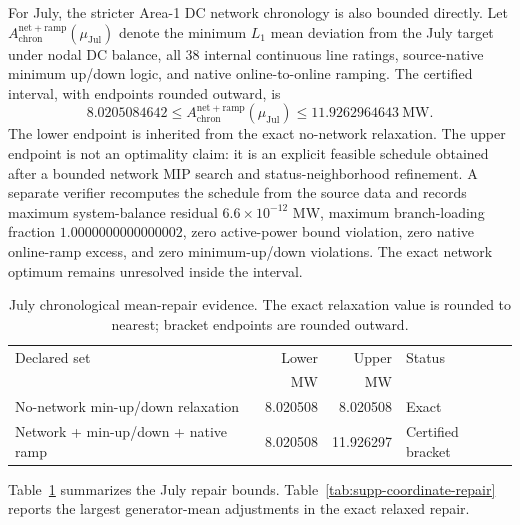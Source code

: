 \documentclass[10pt,journal,onecolumn]{IEEEtran}
\begin{document}
For July, the stricter Area-1 DC network chronology is also bounded directly. Let $A_{\mathrm{chron}}^{\mathrm{net+ramp}}(\mu_{\mathrm{Jul}})$ denote the minimum $L_1$ mean deviation from the July target under nodal DC balance, all 38 internal continuous line ratings, source-native minimum up/down logic, and native online-to-online ramping. The certified interval, with endpoints rounded outward, is
\begin{equation}
8.0205084642\le A_{\mathrm{chron}}^{\mathrm{net+ramp}}(\mu_{\mathrm{Jul}})\le11.9262964643\ \mathrm{MW}.
\end{equation}
The lower endpoint is inherited from the exact no-network relaxation. The upper endpoint is not an optimality claim: it is an explicit feasible schedule obtained after a bounded network MIP search and status-neighborhood refinement. A separate verifier recomputes the schedule from the source data and records maximum system-balance residual $6.6\times10^{-12}$ MW, maximum branch-loading fraction $1.0000000000000002$, zero active-power bound violation, zero native online-ramp excess, and zero minimum-up/down violations. The exact network optimum remains unresolved inside the interval.

\begin{table}[t]
\centering
\caption{July chronological mean-repair evidence. The exact relaxation value is rounded to nearest; bracket endpoints are rounded outward.}
\label{tab:supp-repair}
\begin{tabular}{lrrl}
\toprule
Declared set & Lower & Upper & Status\\
 & MW & MW & \\
\midrule
No-network min-up/down relaxation & 8.020508 & 8.020508 & Exact\\
Network + min-up/down + native ramp & 8.020508 & 11.926297 & Certified bracket\\
\bottomrule
\end{tabular}
\end{table}

Table~\ref{tab:supp-repair} summarizes the July repair bounds. Table~\ref{tab:supp-coordinate-repair} reports the largest generator-mean adjustments in the exact relaxed repair.
\end{document}
